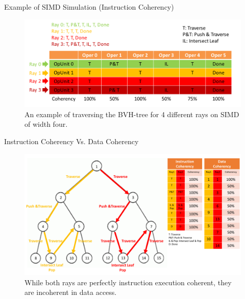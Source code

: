 \documentclass{beamer}
\begin{document}
\begin{frame}{Example of SIMD Simulation (Instruction Coherency)}
	\begin{figure}
		\includegraphics[width=\linewidth]{figures/SIMDExecEg}
		\caption{An example of traversing the BVH-tree for 4 different rays on SIMD of width four.}
	\end{figure}
\end{frame}

\begin{frame}{Instruction Coherency Vs. Data Coherency}
	\begin{figure}
		\includegraphics[width=\linewidth]{figures/InstCohEg}
		\caption{While both rays are perfectly instruction execution coherent, they are incoherent in data access.}
	\end{figure}
\end{frame}
\end{document}
